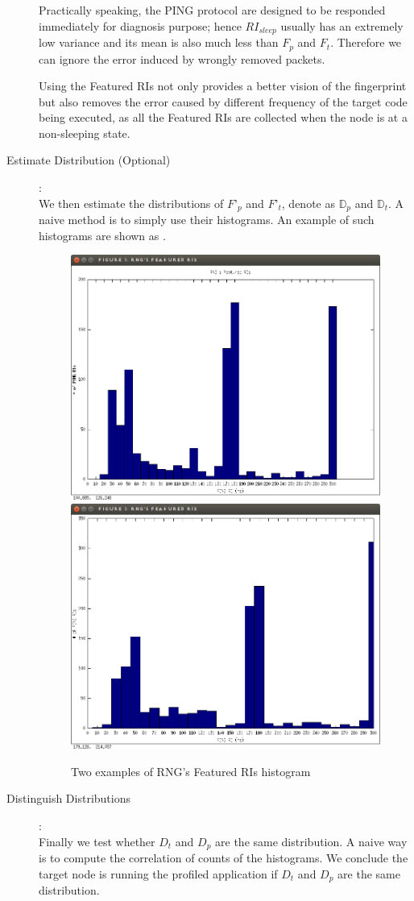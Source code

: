 \begin{description}
Practically speaking, the PING protocol are designed to be responded immediately for diagnosis purpose; hence $RI_{sleep}$ usually has an extremely low variance and its mean is also much less than $F_p$ and $F_t$. Therefore we can ignore the error induced by wrongly removed packets.

Using the Featured RIs not only provides a better vision of the fingerprint but also removes the error caused by different frequency of the target code being executed, as all the Featured RIs are  collected when the node is at a non-sleeping state. 

\item[Estimate Distribution (Optional)]: \hfill\\
We then estimate the distributions of $F’_p$ and $F’_t$, denote as $\mathbb{D}_p$ and $\mathbb{D}_t$. A naive method is to simply use their histograms. An example of such histograms are shown as .

\begin{figure}
\center
{
	\includegraphics[width=0.49 \textwidth]{fig/featuredri_rng1.png}
	\includegraphics[width=0.49 \textwidth]{fig/featuredri_rng2.png}
}
\caption{Two examples of RNG’s Featured RIs histogram}
\label{Fig: featuredri_rng}
\end{figure}

\item[Distinguish Distributions]: \hfill\\
Finally we test whether $D_t$ and $D_p$ are the same distribution. A naive way is to compute the correlation of counts of the histograms. We conclude the target node is running the profiled application if $D_t$ and $D_p$ are the same distribution.
\end{description}

